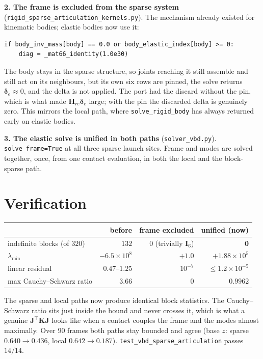 \documentclass[11pt,a4paper]{article}
\begin{document}
\textbf{2. The frame is excluded from the sparse system}
(\texttt{rigid\_sparse\_articulation\_kernels.py}). The mechanism already
existed for kinematic bodies; elastic bodies now use it:

\begin{lstlisting}
if body_inv_mass[body] == 0.0 or body_elastic_index[body] >= 0:
    diag = _mat66_identity(1.0e30)
\end{lstlisting}

The body stays in the sparse structure, so joints reaching it still assemble and
still act on its neighbours, but its own six rows are pinned, the solve returns
$\bm{\delta}_e\approx 0$, and the delta is not applied. The port had the discard
without the pin, which is what made $\mathbf{H}_{re}\bm{\delta}_e$ large; with
the pin the discarded delta is genuinely zero. This mirrors the local path,
where \texttt{solve\_rigid\_body} has always returned early on elastic bodies.

\textbf{3. The elastic solve is unified in both paths}
(\texttt{solver\_vbd.py}). \texttt{solve\_frame=True} at all three sparse launch
sites. Frame and modes are solved together, once, from one contact evaluation,
in both the local and the block-sparse path.

\section*{Verification}

\begin{center}\small
\begin{tabular}{@{}lrrr@{}}
\toprule
 & \textbf{before} & \textbf{frame excluded} & \textbf{unified (now)} \\
\midrule
indefinite blocks (of $320$) & $132$ & $0$ (trivially $\mathbf{I}_6$) & $\mathbf{0}$ \\
$\lambda_{\min}$             & $-6.5\times10^{8}$ & $+1.0$ & $+1.88\times10^{5}$ \\
linear residual              & $0.47$--$1.25$ & $10^{-7}$ & $\le 1.2\times10^{-5}$ \\
max Cauchy--Schwarz ratio    & $3.66$ & $0$ & $\mathbf{0.9962}$ \\
\bottomrule
\end{tabular}
\end{center}

The sparse and local paths now produce identical block statistics. The
Cauchy--Schwarz ratio sits just inside the bound and never crosses it, which is
what a genuine $\mathbf{J}^\top\mathbf{K}\mathbf{J}$ looks like when a contact
couples the frame and the modes almost maximally. Over $90$ frames both paths
stay bounded and agree (base $z$: sparse $0.640\to0.436$, local
$0.642\to0.187$). \texttt{test\_vbd\_sparse\_articulation} passes $14/14$.
\end{document}

